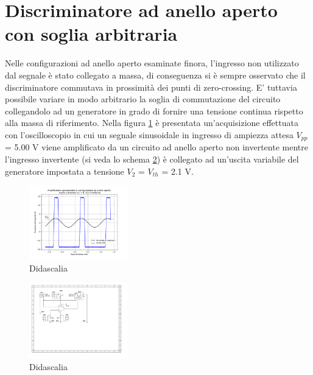 \documentclass[journal]{IEEEtran}
\begin{document}
\section{Discriminatore ad anello aperto con soglia arbitraria} %

Nelle configurazioni ad anello aperto esaminate finora, l'ingresso non utilizzato dal segnale è stato collegato a massa, di conseguenza si è sempre osservato che il discriminatore commutava in prossimità dei punti di zero-crossing. E' tuttavia possibile variare in modo arbitrario la soglia di commutazione del circuito collegandolo ad un generatore in grado di fornire una tensione continua rispetto alla massa di riferimento. Nella figura \ref{fig:biased_scope} è presentata un'acquisizione effettuata con l'oscilloscopio in cui un segnale sinusoidale in ingresso di ampiezza attesa $V_{pp}$ = 5.00 V viene amplificato da un circuito ad anello aperto non invertente mentre l'ingresso invertente (si veda lo schema \ref{fig:biased}) è collegato ad un'uscita variabile del generatore impostata a tensione $V_2$ = $V_{th}$ = 2.1 V. 


\begin{figure}[H]%
\begin{center}
\includegraphics[width=0.38\textwidth]{analysis/output/OPA-open-loop-biased_threshold.pdf}
\caption{Didascalia}
\label{fig:biased_scope}
\end{center}
\end{figure}


\begin{figure}[H]%
\begin{center}
\includegraphics[width=0.38\textwidth]{sch-simulations/output/OPA-biased.pdf}
\caption{Didascalia}
\label{fig:biased}
\end{center}
\end{figure}
\end{document}
